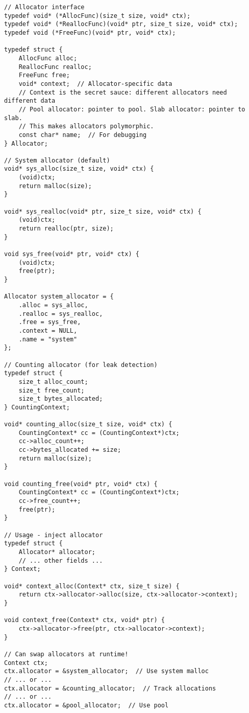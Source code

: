 \begin{lstlisting}
// Allocator interface
typedef void* (*AllocFunc)(size_t size, void* ctx);
typedef void* (*ReallocFunc)(void* ptr, size_t size, void* ctx);
typedef void (*FreeFunc)(void* ptr, void* ctx);

typedef struct {
    AllocFunc alloc;
    ReallocFunc realloc;
    FreeFunc free;
    void* context;  // Allocator-specific data
    // Context is the secret sauce: different allocators need different data
    // Pool allocator: pointer to pool. Slab allocator: pointer to slab.
    // This makes allocators polymorphic.
    const char* name;  // For debugging
} Allocator;

// System allocator (default)
void* sys_alloc(size_t size, void* ctx) {
    (void)ctx;
    return malloc(size);
}

void* sys_realloc(void* ptr, size_t size, void* ctx) {
    (void)ctx;
    return realloc(ptr, size);
}

void sys_free(void* ptr, void* ctx) {
    (void)ctx;
    free(ptr);
}

Allocator system_allocator = {
    .alloc = sys_alloc,
    .realloc = sys_realloc,
    .free = sys_free,
    .context = NULL,
    .name = "system"
};

// Counting allocator (for leak detection)
typedef struct {
    size_t alloc_count;
    size_t free_count;
    size_t bytes_allocated;
} CountingContext;

void* counting_alloc(size_t size, void* ctx) {
    CountingContext* cc = (CountingContext*)ctx;
    cc->alloc_count++;
    cc->bytes_allocated += size;
    return malloc(size);
}

void counting_free(void* ptr, void* ctx) {
    CountingContext* cc = (CountingContext*)ctx;
    cc->free_count++;
    free(ptr);
}

// Usage - inject allocator
typedef struct {
    Allocator* allocator;
    // ... other fields ...
} Context;

void* context_alloc(Context* ctx, size_t size) {
    return ctx->allocator->alloc(size, ctx->allocator->context);
}

void context_free(Context* ctx, void* ptr) {
    ctx->allocator->free(ptr, ctx->allocator->context);
}

// Can swap allocators at runtime!
Context ctx;
ctx.allocator = &system_allocator;  // Use system malloc
// ... or ...
ctx.allocator = &counting_allocator;  // Track allocations
// ... or ...
ctx.allocator = &pool_allocator;  // Use pool
\end{lstlisting}

